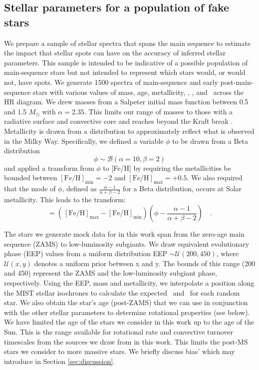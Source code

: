 \subsection{Stellar parameters for a population of fake stars}
\label{sec:stellar_parameters}
We prepare a sample of stellar spectra that spans the main sequence to estimate the impact that stellar spots can have on the accuracy of inferred stellar parameters. This sample is intended to be indicative of a possible population of main-sequence stars but not intended to represent which stars would, or would not, have spots.
We generate 1500 spectra of main-sequence and early post-main-sequence stars with various values of mass, age, metallicity, \vsini, \fspot, and \xspot\ across the HR diagram.
We drew masses from a Salpeter initial mass function \citep{salpeter_luminosity_1955} between 0.5 and 1.5 $M_\odot$ with $\alpha = 2.35$. This limits our range of masses to those with a radiative surface and convective core and reaches beyond the Kraft break \citep{kraft_studies_1967}. Metallicity is drawn from a distribution to approximately reflect what is observed in the Milky Way. Specifically, we defined a variable $\phi$ to be drawn from a Beta distribution
\begin{equation}
    \phi \sim \mathcal{B}\left(\alpha=10, \beta=2\right)
\end{equation}
and applied a transform from $\phi$ to [Fe/H] by requiring the metallicities be bounded between $[\mathrm{Fe/H}]_\mathrm{min} =-2$ and $[\mathrm{Fe/H}]_\mathrm{max} = +0.5$. We also required that the mode of $\phi$, defined as $\frac{\alpha - 1}{\alpha + \beta - 2}$ for a Beta distribution, occurs at Solar metallicity. This leads to the transform:
\begin{equation}
    [\mathrm{Fe/H}] = \left(\frac{}{}[\mathrm{Fe/H}]_\mathrm{max}-[\mathrm{Fe/H}]_\mathrm{min}\right)\left(\phi - \frac{\alpha - 1}{\alpha + \beta - 2}\right) \quad .
\end{equation}

The stars we generate mock data for in this work span from the zero-age main sequence (ZAMS) to low-luminosity subgiants. We draw equivalent evolutionary phase (EEP) values from a uniform distribution EEP $\sim \mathcal{U}(200,450)$, where $\mathcal{U}\left(x,y\right)$ denotes a uniform prior between x and y.
The bounds of this range (200 and 450) represent the ZAMS and the low-luminosity subgiant phase, respectively. 
Using the EEP, mass and metallicity, we interpolate a position along the MIST stellar isochrones \citep{morton_isochrones_2015} to calculate the expected \teff\ and \logg\ for each random star. We also obtain the star's age (post-ZAMS) that we can use in conjunction with the other stellar parameters to determine rotational properties (see below). We have limited the age of the stars we consider in this work up to the age of the Sun. This is the range available for rotational rate and convective turnover timescales from the sources we draw from in this work. This limits the post-MS stars we consider to more massive stars. We briefly discuss bias' which may introduce in Section \ref{sec:discussion}.

